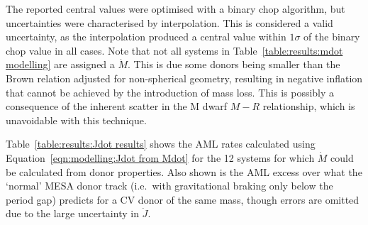 The reported central values were optimised with a binary chop algorithm, but uncertainties were characterised by interpolation. This is considered a valid uncertainty, as the interpolation produced a central value within $1\sigma$ of the binary chop value in all cases.
Note that not all systems in Table~\ref{table:results:mdot modelling} are assigned a $\dot M$.
This is due some donors being smaller than the Brown relation adjusted for non-spherical geometry, resulting in negative inflation that cannot be achieved by the introduction of mass loss.
This is possibly a consequence of the inherent scatter in the M dwarf $M - R$ relationship, which is unavoidable with this technique.

Table~\ref{table:results:Jdot results} shows the AML rates calculated using Equation~\ref{eqn:modelling:Jdot from Mdot} for the 12 systems for which $\dot M$ could be calculated from donor properties. Also shown is the AML excess over what the `normal' MESA donor track (i.e.\ with gravitational braking only below the period gap) predicts for a CV donor of the same mass, though errors are omitted due to the large uncertainty in $\dot J$.


